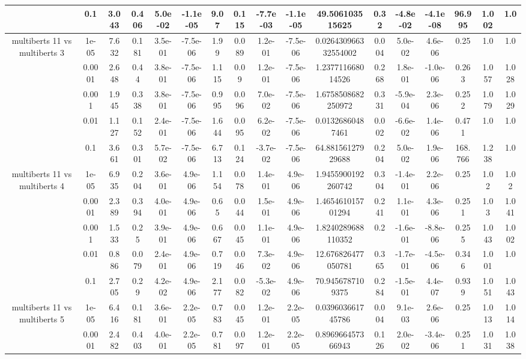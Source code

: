 \begin{tabular}{|c|c|c|c|c|c|c|c|c|c|c|c|c|c|c|c|c|}
 & 0.1 & 3.043 & 0.406 & 5.0e-02 & -1.1e-05 & 9.07 & 0.115 & -7.7e-03 & -1.1e-05 & 49.506103515625 & 0.32 & -4.8e-02 & -4.1e-08 & 96.995 & 1.002 & 1.0 \\
\hline
\multirow{5}{*}{multiberts 11 vs multiberts 3} & 1e-05 & 7.632 & 0.181 & 3.5e-01 & -7.5e-06 & 1.99 & 0.089 & 1.2e-01 & -7.5e-06 & 0.026430966332554002 & 0.004 & 5.0e-02 & 4.6e-06 & 0.25 & 1.0 & 1.0 \\
 & 0.0001 & 2.648 & 0.44 & 3.8e-01 & -7.5e-06 & 1.115 & 0.09 & 1.2e-01 & -7.5e-06 & 1.237711668014526 & 0.268 & 1.8e-01 & -1.0e-06 & 0.263 & 1.057 & 1.028 \\
 & 0.001 & 1.945 & 0.338 & 3.8e-01 & -7.5e-06 & 0.995 & 0.096 & 7.0e-02 & -7.5e-06 & 1.6758508682250972 & 0.331 & -5.9e-04 & 2.3e-06 & 0.252 & 1.079 & 1.029 \\
 & 0.01 & 1.127 & 0.152 & 2.4e-01 & -7.5e-06 & 1.644 & 0.095 & 6.2e-02 & -7.5e-06 & 0.01326860487461 & 0.002 & -6.6e-02 & 1.4e-06 & 0.471 & 1.0 & 1.0 \\
 & 0.1 & 3.661 & 0.301 & 5.7e-02 & -7.5e-06 & 6.713 & 0.124 & -3.7e-02 & -7.5e-06 & 64.88156127929688 & 0.204 & 5.0e-02 & 1.9e-06 & 168.766 & 1.238 & 1.0 \\
\hline
\multirow{5}{*}{multiberts 11 vs multiberts 4} & 1e-05 & 6.935 & 0.204 & 3.6e-01 & 4.9e-06 & 1.154 & 0.078 & 1.4e-01 & 4.9e-06 & 1.9455900192260742 & 0.304 & -1.4e-01 & 2.2e-06 & 0.25 & 1.02 & 1.02 \\
 & 0.0001 & 2.389 & 0.394 & 4.0e-01 & 4.9e-06 & 0.65 & 0.044 & 1.5e-01 & 4.9e-06 & 1.465461015701294 & 0.241 & 1.1e-01 & 4.3e-06 & 0.251 & 1.03 & 1.041 \\
 & 0.001 & 1.533 & 0.25 & 3.9e-01 & 4.9e-06 & 0.667 & 0.045 & 1.1e-01 & 4.9e-06 & 1.8240289688110352 & 0.2 & -1.6e-01 & -8.8e-06 & 0.255 & 1.043 & 1.002 \\
 & 0.01 & 0.886 & 0.079 & 2.4e-01 & 4.9e-06 & 0.719 & 0.046 & 7.3e-02 & 4.9e-06 & 12.676826477050781 & 0.365 & -1.7e-01 & -4.5e-06 & 0.346 & 1.001 & 1.0 \\
 & 0.1 & 2.705 & 0.29 & 4.2e-02 & 4.9e-06 & 2.177 & 0.082 & -5.3e-02 & 4.9e-06 & 70.9456787109375 & 0.284 & -1.5e-01 & 4.4e-07 & 0.939 & 1.051 & 1.043 \\
\hline
\multirow{5}{*}{multiberts 11 vs multiberts 5} & 1e-05 & 6.416 & 0.181 & 3.6e-01 & 2.2e-05 & 0.783 & 0.045 & 1.2e-01 & 2.2e-05 & 0.039603661745786 & 0.004 & 9.1e-03 & 2.6e-06 & 0.25 & 1.013 & 1.014 \\
 & 0.0001 & 2.482 & 0.403 & 4.0e-01 & 2.2e-05 & 0.781 & 0.097 & 1.2e-01 & 2.2e-05 & 0.896966457366943 & 0.126 & 2.0e-02 & -3.4e-06 & 0.251 & 1.031 & 1.038 \\

\end{tabular}
